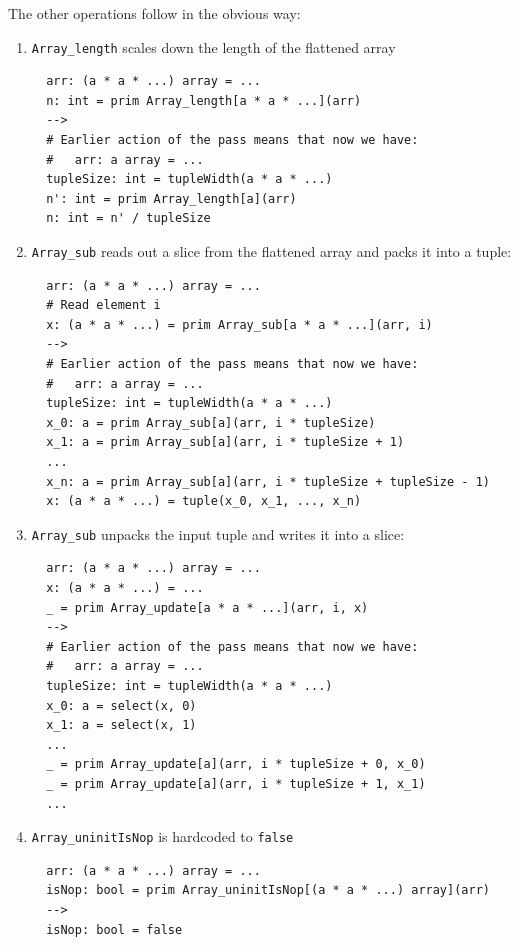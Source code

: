 \documentclass[leqno,11pt]{article}
\begin{document}
The other operations follow in the obvious way:
\begin{enumerate}
\item \texttt{Array\_length} scales down the length of the flattened array

\begin{verbatim}
  arr: (a * a * ...) array = ...
  n: int = prim Array_length[a * a * ...](arr)
  -->
  # Earlier action of the pass means that now we have:
  #   arr: a array = ...
  tupleSize: int = tupleWidth(a * a * ...)
  n': int = prim Array_length[a](arr)
  n: int = n' / tupleSize
\end{verbatim}

\item \texttt{Array\_sub} reads out a slice from the flattened array and packs
  it into a tuple:

\begin{verbatim}
  arr: (a * a * ...) array = ...
  # Read element i
  x: (a * a * ...) = prim Array_sub[a * a * ...](arr, i)
  -->
  # Earlier action of the pass means that now we have:
  #   arr: a array = ...
  tupleSize: int = tupleWidth(a * a * ...)
  x_0: a = prim Array_sub[a](arr, i * tupleSize)
  x_1: a = prim Array_sub[a](arr, i * tupleSize + 1)
  ...
  x_n: a = prim Array_sub[a](arr, i * tupleSize + tupleSize - 1)
  x: (a * a * ...) = tuple(x_0, x_1, ..., x_n)
\end{verbatim}

\item \texttt{Array\_sub} unpacks the input tuple and writes it into a slice:

\begin{verbatim}
  arr: (a * a * ...) array = ...
  x: (a * a * ...) = ...
  _ = prim Array_update[a * a * ...](arr, i, x)
  -->
  # Earlier action of the pass means that now we have:
  #   arr: a array = ...
  tupleSize: int = tupleWidth(a * a * ...)
  x_0: a = select(x, 0)
  x_1: a = select(x, 1)
  ...
  _ = prim Array_update[a](arr, i * tupleSize + 0, x_0)
  _ = prim Array_update[a](arr, i * tupleSize + 1, x_1)
  ...
\end{verbatim}

\item \texttt{Array\_uninitIsNop} is hardcoded to \texttt{false}

\begin{verbatim}
  arr: (a * a * ...) array = ...
  isNop: bool = prim Array_uninitIsNop[(a * a * ...) array](arr)
  -->
  isNop: bool = false
\end{verbatim}


\end{enumerate}
\end{document}
